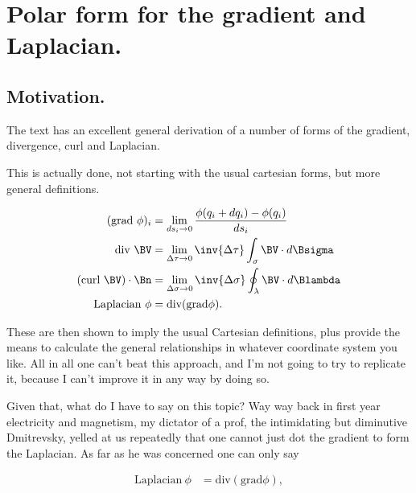 

\chapter{Polar form for the gradient and Laplacian.}
\label{chap:polarGradAndLaplacian}
{}
\date{Dec 1, 2009}

\beginArtWithToc

\section{Motivation.}

The text \cite{byron1992mca} has an excellent general derivation of a number of forms of the gradient, divergence, curl and Laplacian.

This is actually done, not starting with the usual cartesian forms, but more general definitions.

\begin{align}\label{eqn:divGradCurLap:1}
(\text{grad}\  \phi)_i &= \lim_{ds_i \rightarrow 0} \frac{\phi(q_i + dq_i) - \phi(q_i)}{ds_i} \\
\text{div}\  \BV &= \lim_{\Delta \tau \rightarrow 0} \inv{\Delta \tau} \int_\sigma \BV \cdot d\Bsigma \\
(\text{curl}\  \BV) \cdot \Bn &= \lim_{\Delta \sigma \rightarrow 0} \inv{\Delta \sigma} \oint_\lambda \BV \cdot d\Blambda \\
\text{Laplacian}\  \phi &= \text{div} (\text{grad} \phi).
\end{align}

These are then shown to imply the usual Cartesian definitions, plus provide the means to calculate the general relationships in whatever coordinate system you like.  All in all one can't beat this approach, and I'm not going to try to replicate it, because I can't improve it in any way by doing so.

Given that, what do I have to say on this topic?  Way way back in first year electricity and magnetism, my dictator of a prof, the intimidating but diminutive Dmitrevsky, yelled at us repeatedly that one cannot just dot the gradient to form the Laplacian.  As far as he was concerned one can only say

\begin{align}\label{eqn:divGradCurLap:2}
\text{Laplacian}\  \phi &= \text{div} (\text{grad} \phi),
\end{align}

